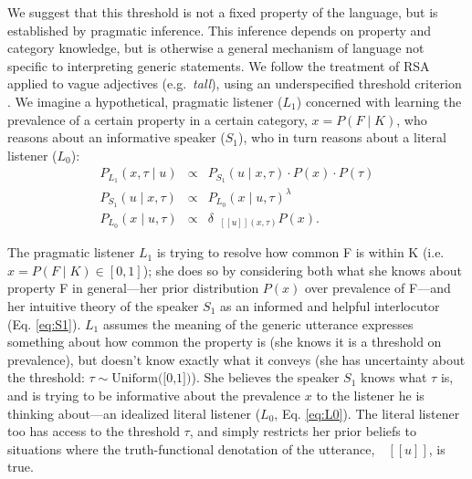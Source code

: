 \documentclass[10pt,letterpaper]{article}
\newcommand{\denote}[1]{\mbox{ $[\![ #1 ]\!]$}}
\begin{document}
We suggest that this threshold is not a fixed property of the language, but is established by pragmatic inference.
This inference depends on property and category knowledge, but is otherwise a general mechanism of language not specific to interpreting generic statements.
We follow the treatment of RSA applied to vague adjectives (e.g.~\emph{tall}), using an underspecified threshold criterion \cite{Lassiter2013,Lassiter2015}. %
We imagine a hypothetical, pragmatic listener ($L_1$) concerned with learning the prevalence of a certain property in a certain category, $x=P(F \mid K)$, who reasons about an informative speaker ($S_1$), who in turn reasons about a literal listener ($L_0$):
\begin{eqnarray}
P_{L_{1}}(x , \tau \mid u) &\propto& P_{S_{1}}(u \mid x, \tau) \cdot P(x) \cdot P(\tau) \label{eq:L1}\\
P_{S_{1}}(u \mid x, \tau) &\propto&  {P_{L_{0}}(x \mid u, \tau)}^{\lambda} \label{eq:S1}\\
P_{L_{0}}(x \mid u, \tau) &\propto& {\delta_{\denote{u}(x, \tau)} P(x)}. \label{eq:L0}
\end{eqnarray}





The pragmatic listener $L_1$ is trying to resolve how common F is within K (i.e.~$x = P(F\mid K) \in [0, 1]$); 
she does so by considering both what she knows about property F in general---her prior distribution $P(x)$ over prevalence of F---and her intuitive theory of the speaker $S_{1}$ as an informed and helpful interlocutor (Eq. \ref{eq:S1}).
$L_1$ assumes the meaning of the generic utterance expresses something about how common the property is (she knows it is a threshold on prevalence), but doesn't know exactly what it conveys (she has uncertainty about the threshold: $\tau \sim \text{Uniform([0,1])}$).
She believes the speaker $S_1$ knows what $\tau$ is, and is trying to be informative about the prevalence $x$ to the listener he is thinking about---an idealized literal listener ($L_{0}$, Eq. \ref{eq:L0}).
The literal listener too has access to the threshold $\tau$, and simply restricts her prior beliefs to situations where the truth-functional denotation of the utterance, $\denote{u}$, is true.
\end{document}
